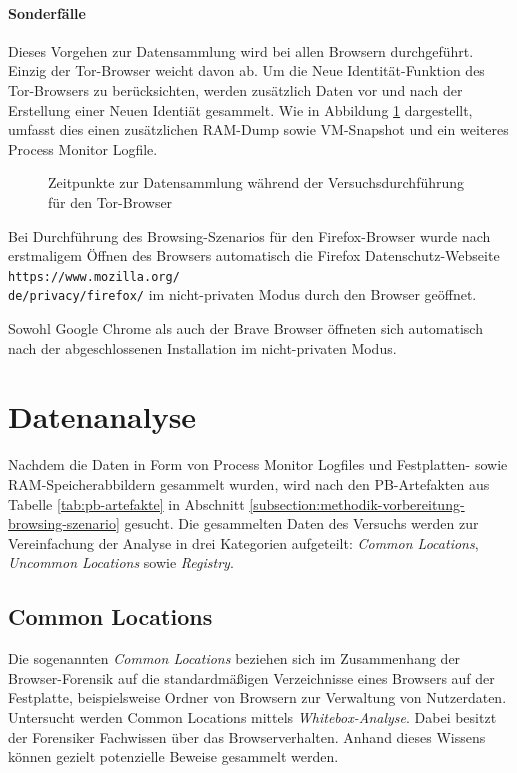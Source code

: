 \paragraph*{Sonderfälle}
Dieses Vorgehen zur Datensammlung wird bei allen Browsern durchgeführt. Einzig der Tor-Browser weicht davon ab. Um die \glqq{}Neue Identität\grqq{}-Funktion des Tor-Browsers zu berücksichten, werden zusätzlich Daten vor und nach der Erstellung einer \glqq{}Neuen Identiät\grqq{} gesammelt. Wie in Abbildung \ref{img:zeitpunkte-datensammlung-tor} dargestellt, umfasst dies einen zusätzlichen RAM-Dump sowie VM-Snapshot und ein weiteres Process Monitor Logfile.
\begin{figure}[h!]
	\centering
	\small
	\centerline{\resizebox{\linewidth}{!}{}}
	\caption{Zeitpunkte zur Datensammlung während der Versuchsdurchführung für den Tor-Browser}
	\label{img:zeitpunkte-datensammlung-tor}
\end{figure}

Bei Durchführung des Browsing-Szenarios für den Firefox-Browser wurde nach erstmaligem Öffnen des Browsers automatisch die Firefox Datenschutz-Webseite \texttt{https://www.mozilla.org/\\
de/privacy/firefox/} im nicht-privaten Modus durch den Browser geöffnet. 

Sowohl Google Chrome als auch der Brave Browser öffneten sich automatisch nach der abgeschlossenen Installation im nicht-privaten Modus.

\section{Datenanalyse}
\label{section:methodik-datenanalyse}
Nachdem die Daten in Form von Process Monitor Logfiles und Festplatten- sowie RAM-Speicherabbildern gesammelt wurden, wird nach den PB-Artefakten aus Tabelle \ref{tab:pb-artefakte} in Abschnitt \ref{subsection:methodik-vorbereitung-browsing-szenario} gesucht. 
Die gesammelten Daten des Versuchs werden zur Vereinfachung der Analyse in drei Kategorien aufgeteilt: \textit{Common Locations}, \textit{Uncommon Locations} sowie \textit{Registry}.

\subsection{Common Locations}
\label{subsection:methodik-datenanalyse-commonlocations}
Die sogenannten \textit{Common Locations} beziehen sich im Zusammenhang der Browser-Forensik auf die standardmäßigen Verzeichnisse eines Browsers auf der Festplatte, beispielsweise Ordner von Browsern zur Verwaltung von Nutzerdaten.
Untersucht werden Common Locations mittels \textit{Whitebox-Analyse}. Dabei besitzt der Forensiker Fachwissen über das Browserverhalten. Anhand dieses Wissens können gezielt potenzielle Beweise gesammelt werden. \cite{Bonetti.2014}

